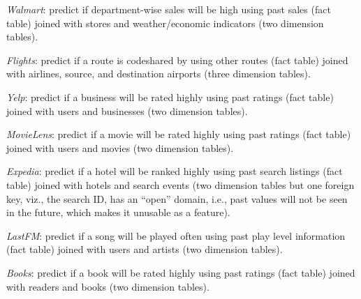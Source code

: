 \documentclass{vldb}
\begin{document}
\vspace{1mm}
\textit{Walmart}: predict if department-wise sales will be high using past sales (fact table) joined with stores and weather/economic indicators (two dimension tables).

\vspace{1mm}
\textit{Flights}: predict if a route is codeshared by using other routes (fact table) joined with airlines, source, and destination airports (three dimension tables).

\vspace{1mm}
\textit{Yelp}: predict if a business will be rated highly using past ratings (fact table) joined with users and businesses (two dimension tables).

\vspace{1mm}
\textit{MovieLens}: predict if a movie will be rated highly using past ratings (fact table) joined with users and movies (two dimension tables).

\vspace{1mm}
\textit{Expedia}: predict if a hotel will be ranked highly using past search listings (fact table) joined with hotels and search events (two dimension tables 
but one foreign key, viz., the search ID, has an ``open'' domain, i.e., past values will not be seen in the future, which makes it unusable as a feature).

\vspace{1mm}
\textit{LastFM}: predict if a song will be played often using past play level information (fact table) joined with users and artists (two dimension tables).

\vspace{1mm}
\textit{Books}: predict if a book will be rated highly using past ratings (fact table) joined with readers and books (two dimension tables).
\end{document}
